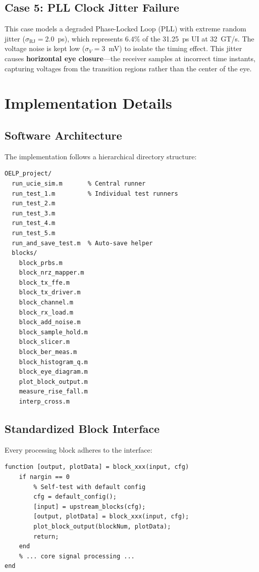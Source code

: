 \documentclass[conference]{IEEEtran}
\begin{document}
\subsection{Case 5: PLL Clock Jitter Failure}

This case models a degraded Phase-Locked Loop (PLL) with extreme random jitter ($\sigma_{\text{RJ}} = 2.0$~ps), which represents $6.4\%$ of the 31.25~ps UI at 32~GT/s. The voltage noise is kept low ($\sigma_V = 3$~mV) to isolate the timing effect. This jitter causes \textbf{horizontal eye closure}---the receiver samples at incorrect time instants, capturing voltages from the transition regions rather than the center of the eye.

\section{Implementation Details}

\subsection{Software Architecture}

The implementation follows a hierarchical directory structure:

\begin{lstlisting}[caption={Project directory structure},label={lst:dir},language={}]
OELP_project/
  run_ucie_sim.m       % Central runner
  run_test_1.m         % Individual test runners
  run_test_2.m
  run_test_3.m
  run_test_4.m
  run_test_5.m
  run_and_save_test.m  % Auto-save helper
  blocks/
    block_prbs.m
    block_nrz_mapper.m
    block_tx_ffe.m
    block_tx_driver.m
    block_channel.m
    block_rx_load.m
    block_add_noise.m
    block_sample_hold.m
    block_slicer.m
    block_ber_meas.m
    block_histogram_q.m
    block_eye_diagram.m
    plot_block_output.m
    measure_rise_fall.m
    interp_cross.m
\end{lstlisting}

\subsection{Standardized Block Interface}

Every processing block adheres to the interface:
\begin{lstlisting}[caption={Standard block function signature}]
function [output, plotData] = block_xxx(input, cfg)
    if nargin == 0
        % Self-test with default config
        cfg = default_config();
        [input] = upstream_blocks(cfg);
        [output, plotData] = block_xxx(input, cfg);
        plot_block_output(blockNum, plotData);
        return;
    end
    % ... core signal processing ...
end
\end{lstlisting}
\end{document}
